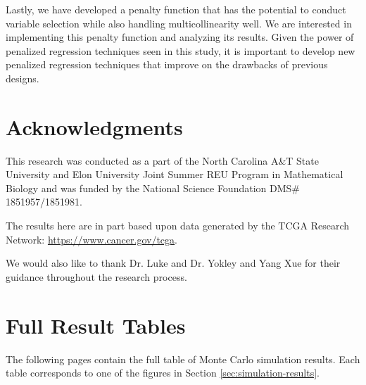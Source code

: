 \documentclass{article}
\begin{document}
Lastly, we have developed a penalty function that has the potential to conduct variable selection while also handling multicollinearity well. We are interested in implementing this penalty function and analyzing its results. Given the power of penalized regression techniques seen in this study, it is important to develop new penalized regression techniques that improve on the drawbacks of previous designs.

\newpage
\section{Acknowledgments}

This research was conducted as a part of the North Carolina A\&T State University and Elon University Joint Summer REU Program in Mathematical Biology and was funded by the National Science Foundation DMS\# 1851957/1851981.

The results here are in part based upon data generated by the TCGA Research Network: \href{https://www.cancer.gov/tcga}{https://www.cancer.gov/tcga}.

We would also like to thank Dr. Luke and Dr. Yokley and Yang Xue for their guidance throughout the research process.

\newpage



\newpage
\appendix
\section{Full Result Tables}\label{app:full-results}
The following pages contain the full table of Monte Carlo simulation results. Each table corresponds to one of the figures in Section \ref{sec:simulation-results}.

\setlength{\tabcolsep}{3pt}
\end{document}
